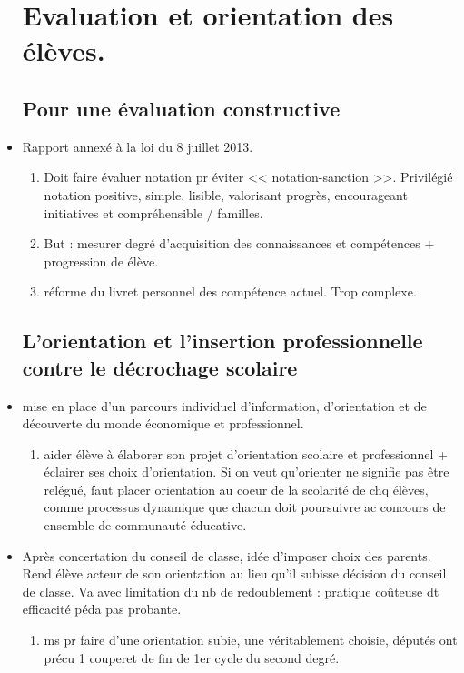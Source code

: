 \documentclass[12pt]{report}
\begin{document}
\begin{itemize}
\section{Evaluation et orientation des élèves.}

\subsection{Pour une évaluation constructive}

\item Rapport annexé à la loi du 8 juillet 2013. 
\begin{enumerate}
\item Doit faire évaluer notation pr éviter << notation-sanction >>. Privilégié notation positive, simple, lisible, valorisant progrès, encourageant initiatives et compréhensible / familles. \\
\item But : mesurer degré d'acquisition des connaissances et compétences + progression de élève. \\
\item réforme du livret personnel des compétence actuel. Trop complexe.
\end{enumerate}

\subsection{L'orientation et l'insertion professionnelle contre le décrochage scolaire}
\item mise en place d'un parcours individuel d'information, d'orientation et de découverte du monde économique et professionnel. \\
\begin{enumerate}
\item aider élève à élaborer son projet d'orientation scolaire et professionnel + éclairer ses choix d'orientation. Si on veut qu'orienter ne signifie pas être relégué, faut placer orientation au coeur de la scolarité de chq élèves, comme processus dynamique que chacun doit poursuivre ac concours de ensemble de communauté éducative. \\
\end{enumerate}

\item Après concertation du conseil de classe, idée d'imposer choix des parents. Rend élève acteur de son orientation au lieu qu'il subisse décision du conseil de classe. Va avec limitation du nb de redoublement : pratique coûteuse dt efficacité péda pas probante. \\
\begin{enumerate}
\item ms pr faire d'une orientation subie, une véritablement choisie, députés ont précu 1 couperet de fin de 1er cycle du second degré.\\
\end{enumerate}


\end{itemize}
\end{document}
